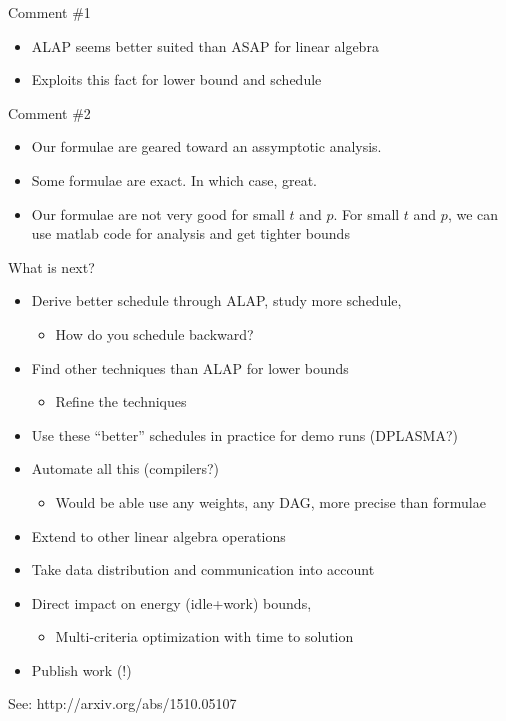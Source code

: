 \begin{frame}

Comment \#1
\begin{itemize}
\item ALAP seems better suited than ASAP for linear algebra
\item Exploits this fact for lower bound and schedule
\end{itemize}

\vspace*{1cm}

Comment \#2
\begin{itemize}
\item Our formulae are geared toward an assymptotic analysis.
\item Some formulae are exact. In which case, great.
\item Our formulae are not very good for small $t$ and $p$. For small $t$ and $p$, we can use matlab code for analysis and get tighter bounds
\end{itemize}

\end{frame}






\begin{frame}

What is next?
\begin{itemize}
\item Derive better schedule through ALAP, study more schedule, 
\begin{itemize}
\item How do you schedule backward?
\end{itemize}
\item Find other techniques than ALAP for lower bounds
\begin{itemize}
\item Refine the techniques
\end{itemize}
\item Use these ``better'' schedules in practice for demo runs (DPLASMA?)
\item Automate all this (compilers?)
\begin{itemize}
\item Would be able use any weights, any DAG, more precise than formulae
\end{itemize}
\item Extend to other linear algebra operations
\item Take data distribution and communication into account
\item Direct impact on energy (idle+work) bounds,
\begin{itemize}
\item Multi-criteria optimization with time to solution
\end{itemize}
\item Publish work (!)
\end{itemize}

See:
http://arxiv.org/abs/1510.05107

\end{frame}




